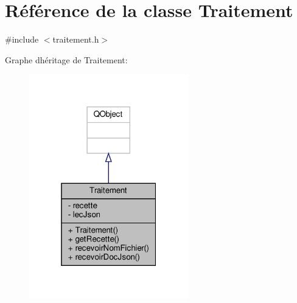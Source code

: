 \hypertarget{classTraitement}{}\section{Référence de la classe Traitement}
\label{classTraitement}


{\ttfamily \#include $<$traitement.\+h$>$}



Graphe d\textquotesingle{}héritage de Traitement\+:\nopagebreak
\begin{figure}[H]
\begin{center}
\leavevmode
\includegraphics[width=196pt]{classTraitement__inherit__graph}
\end{center}
\end{figure}


